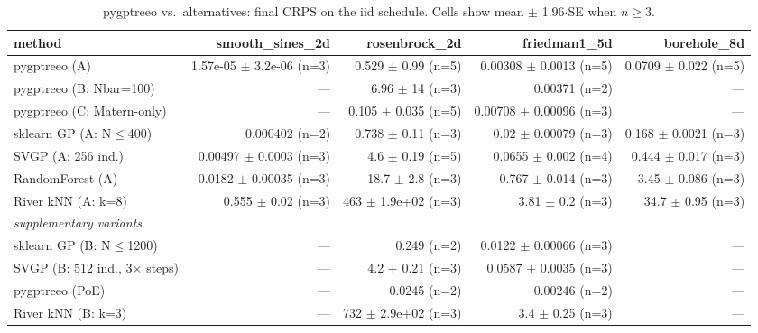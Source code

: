 \begin{table}[h]
\centering
\caption{pygptreeo vs.\ alternatives: final CRPS on the iid schedule. Cells show mean $\pm$ 1.96$\cdot$SE when $n\geq 3$.}
\begin{tabular}{lrrrr}
\toprule
method & smooth\_sines\_2d & rosenbrock\_2d & friedman1\_5d & borehole\_8d \\
\midrule
pygptreeo (A) & 1.57e-05 $\pm$ 3.2e-06 (n=3) & 0.529 $\pm$ 0.99 (n=5) & 0.00308 $\pm$ 0.0013 (n=5) & 0.0709 $\pm$ 0.022 (n=5) \\
pygptreeo (B: Nbar=100) & --- & 6.96 $\pm$ 14 (n=3) & 0.00371 (n=2) & --- \\
pygptreeo (C: Matern-only) & --- & 0.105 $\pm$ 0.035 (n=5) & 0.00708 $\pm$ 0.00096 (n=3) & --- \\
sklearn GP (A: N$\leq$400) & 0.000402 (n=2) & 0.738 $\pm$ 0.11 (n=3) & 0.02 $\pm$ 0.00079 (n=3) & 0.168 $\pm$ 0.0021 (n=3) \\
SVGP (A: 256 ind.) & 0.00497 $\pm$ 0.0003 (n=3) & 4.6 $\pm$ 0.19 (n=5) & 0.0655 $\pm$ 0.002 (n=4) & 0.444 $\pm$ 0.017 (n=3) \\
RandomForest (A) & 0.0182 $\pm$ 0.00035 (n=3) & 18.7 $\pm$ 2.8 (n=3) & 0.767 $\pm$ 0.014 (n=3) & 3.45 $\pm$ 0.086 (n=3) \\
River kNN (A: k=8) & 0.555 $\pm$ 0.02 (n=3) & 463 $\pm$ 1.9e+02 (n=3) & 3.81 $\pm$ 0.2 (n=3) & 34.7 $\pm$ 0.95 (n=3) \\
\midrule
\multicolumn{5}{l}{\textit{supplementary variants}} \\
sklearn GP (B: N$\leq$1200) & --- & 0.249 (n=2) & 0.0122 $\pm$ 0.00066 (n=3) & --- \\
SVGP (B: 512 ind., 3$\times$ steps) & --- & 4.2 $\pm$ 0.21 (n=3) & 0.0587 $\pm$ 0.0035 (n=3) & --- \\
pygptreeo (PoE) & --- & 0.0245 (n=2) & 0.00246 (n=2) & --- \\
River kNN (B: k=3) & --- & 732 $\pm$ 2.9e+02 (n=3) & 3.4 $\pm$ 0.25 (n=3) & --- \\
\bottomrule
\end{tabular}
\end{table}

